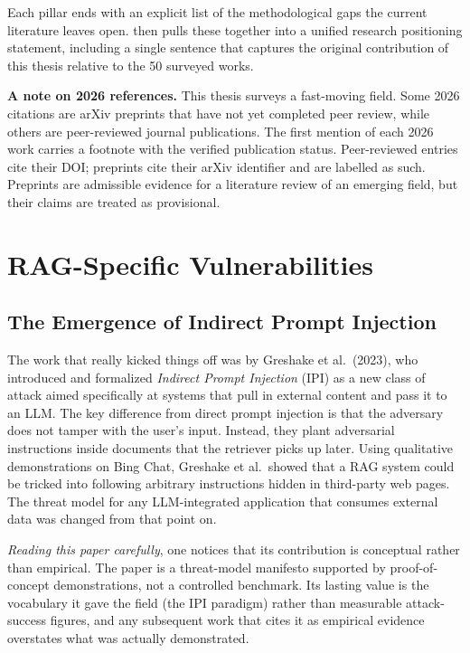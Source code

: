 \documentclass[12pt, a4paper]{article}
\begin{document}
Each pillar ends with an explicit list of the methodological gaps the current literature leaves open.  then pulls these together into a unified research positioning statement, including a single sentence that captures the original contribution of this thesis relative to the 50 surveyed works.

\begin{notebox}
\textbf{A note on 2026 references.} This thesis surveys a fast-moving field. Some 2026 citations are arXiv preprints that have not yet completed peer review, while others are peer-reviewed journal publications. The first mention of each 2026 work carries a footnote with the verified publication status. Peer-reviewed entries cite their DOI; preprints cite their arXiv identifier and are labelled as such. Preprints are admissible evidence for a literature review of an emerging field, but their claims are treated as provisional.
\end{notebox}



\newpage
\section{RAG-Specific Vulnerabilities}
\label{sec:rag-vuln}

\subsection{The Emergence of Indirect Prompt Injection}

The work that really kicked things off was by Greshake et al.\ (2023), who introduced and formalized \emph{Indirect Prompt Injection} (IPI) as a new class of attack aimed specifically at systems that pull in external content and pass it to an LLM. The key difference from direct prompt injection is that the adversary does not tamper with the user's input. Instead, they plant adversarial instructions inside documents that the retriever picks up later. Using qualitative demonstrations on Bing Chat, Greshake et al.\ showed that a RAG system could be tricked into following arbitrary instructions hidden in third-party web pages. The threat model for any LLM-integrated application that consumes external data was changed from that point on.

\begin{critbox}
\textit{Reading this paper carefully}, one notices that its contribution is conceptual rather than empirical. The paper is a threat-model manifesto supported by proof-of-concept demonstrations, not a controlled benchmark. Its lasting value is the vocabulary it gave the field (the IPI paradigm) rather than measurable attack-success figures, and any subsequent work that cites it as empirical evidence overstates what was actually demonstrated.
\end{critbox}
\end{document}
